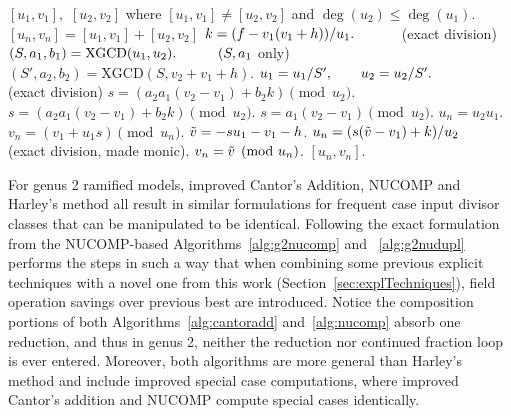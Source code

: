 \begin{algorithm}[htbp]
\caption{Genus 2 Ramified Model Addition (NUCOMP)}
\label{alg:g2nucomp}
\begin{algorithmic}[1]
\Require $[u_1,v_1],$ $[u_2,v_2]$ where $[u_1,v_1] \neq [u_2,v_2]$ and $\deg(u_2) \leq \deg(u_1)$.
\Ensure $[u_n,v_n] = [u_1,v_1] + [u_2,v_2]$
\State $k = (f - v_1(v_1 + h))/u_1. \quad\quad\quad$ (exact division)
\State $(S,a_1,b_1) = \mathrm{XGCD}(u_1,u_2). \quad\quad\quad  (S, a_1$ only)
    \State $(S',a_2,b_2) = \mathrm{XGCD}(S,v_2 + v_1 + h)$.
        \State $u_1 = u_1/S', \quad\quad u_2 = u_2/S'. \quad\quad\quad$ (exact division)
        \State $s = (a_2a_1(v_2 - v_1) + b_2k) \pmod{u_2}$.
    \Else
        \State $s = (a_2a_1(v_2 - v_1) + b_2k) \pmod{u_2}$.
    \EndIf
\Else
    \State $ s = a_1(v_2 - v_1) \pmod{u_2}$.
\EndIf
{}
    \State $u_n = u_2u_1$.
    \State $v_n = (v_1 + u_1s) \pmod{u_n}$.
\Else   
    \State $\tilde{v} = -su_1 - v_1 - h$.
    \State $u_n = (s(\tilde{v} - v_1) + k)/u_2 \quad\quad\quad$ (exact division, made monic).
    \State $v_n = \tilde{v} \pmod{u_n}$.
\EndIf
\State \Return $[u_n,v_n]$.
\end{algorithmic}
\end{algorithm}

For genus 2 ramified models, improved Cantor's Addition, NUCOMP and
Harley's method all result in similar formulations for frequent case input
divisor classes that can be manipulated to be identical. Following the exact
formulation from the NUCOMP-based Algorithms~\ref{alg:g2nucomp} and
~\ref{alg:g2nudupl} performs the steps in such a way that when combining some
previous explicit techniques with a novel one from this work
(Section~\ref{sec:explTechniques}), field operation savings over previous best
are introduced. Notice the composition portions of both
Algorithms~\ref{alg:cantoradd} and~\ref{alg:nucomp} absorb one reduction, and
thus in genus 2, neither the reduction nor continued fraction loop is ever
entered. Moreover, both algorithms are more general than Harley's method and
include improved special case computations, where improved Cantor's addition and
NUCOMP compute special cases identically. 

